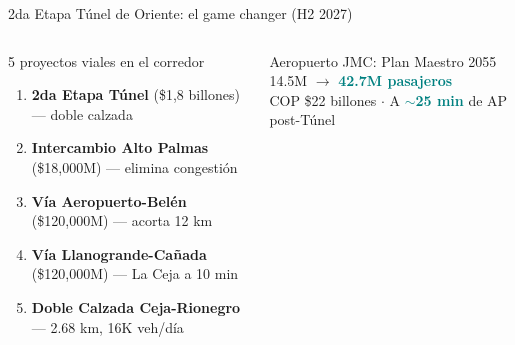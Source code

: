 \documentclass[aspectratio=169, 11pt]{beamer}
\newcommand{\highlight}[1]{\textcolor{teal}{\textbf{#1}}}
\begin{document}
{\begin{frame}{2da Etapa Túnel de Oriente: el game changer (H2 2027)}
\begin{columns}[T]
\begin{exampleblock}{\small 5 proyectos viales en el corredor}
\scriptsize
\begin{enumerate}\setlength{\itemsep}{1pt}
  \item \textbf{2da Etapa Túnel} (\$1,8 billones) --- doble calzada
  \item \textbf{Intercambio Alto Palmas} (\$18,000M) --- elimina congestión
  \item \textbf{Vía Aeropuerto-Belén} (\$120,000M) --- acorta 12 km
  \item \textbf{Vía Llanogrande-Cañada} (\$120,000M) --- La Ceja a 10 min
  \item \textbf{Doble Calzada Ceja-Rionegro} --- 2.68 km, 16K veh/día
\end{enumerate}
\end{exampleblock}

\vspace{2pt}
\begin{exampleblock}{\small Aeropuerto JMC: Plan Maestro 2055}
\centering\footnotesize
14.5M $\to$ \highlight{42.7M pasajeros}\\
{\scriptsize COP \$22 billones $\cdot$ A \highlight{$\sim$25 min} de AP post-Túnel}
\end{exampleblock}
\end{columns}
\end{frame}
}
\end{document}
